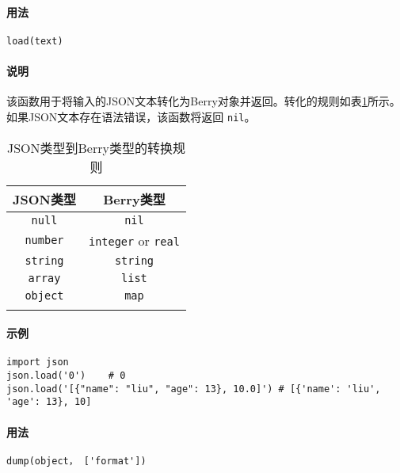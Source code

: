 
\paragraph{用法}
\begin{lstlisting}[language=berry, numbers=none]
load(text)
\end{lstlisting}

\paragraph{说明}
该函数用于将输入的JSON文本转化为Berry对象并返回。转化的规则如表\ref{tab::json2berry_rule}所示。如果JSON文本存在语法错误，该函数将返回 \texttt{nil}。
\begin{table}[htb]
    \centering
    \setlength{\tabcolsep}{18mm}
    \begin{tabular}{cc} \Xhline{1pt}
        \textbf{JSON类型} & \textbf{Berry类型} \\ \hline
        \texttt{null} & \texttt{nil} \\
        \texttt{number} & \texttt{integer} or \texttt{real} \\
        \texttt{string} & \texttt{string} \\
        \texttt{array} & \texttt{list} \\
        \texttt{object} & \texttt{map} \\
        \Xhline{1pt}
    \end{tabular}
    \caption{JSON类型到Berry类型的转换规则}
    \label{tab::json2berry_rule}
\end{table}

\paragraph{示例}
\begin{lstlisting}[language=berry, numbers=none]
import json
json.load('0')    # 0
json.load('[{"name": "liu", "age": 13}, 10.0]') # [{'name': 'liu', 'age': 13}, 10]
\end{lstlisting}


\paragraph{用法}
\begin{lstlisting}[language=berry, numbers=none]
dump(object， ['format'])
\end{lstlisting}

